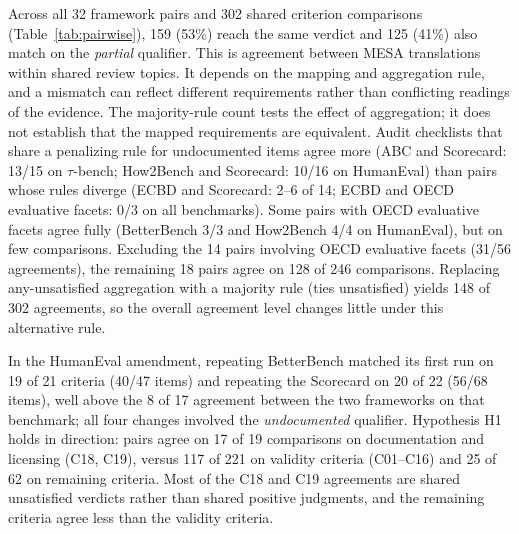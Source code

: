 \documentclass[10pt,conference]{IEEEtran}
\begin{document}
Across all 32 framework pairs and 302 shared criterion comparisons (Table~\ref{tab:pairwise}), 159 (53\%) reach the same verdict and 125 (41\%) also match on the \emph{partial} qualifier. This is agreement between MESA translations within shared review topics. It depends on the mapping and aggregation rule, and a mismatch can reflect different requirements rather than conflicting readings of the evidence. The majority-rule count tests the effect of aggregation; it does not establish that the mapped requirements are equivalent. Audit checklists that share a penalizing rule for undocumented items agree more (ABC and Scorecard: 13/15 on $\tau$-bench; How2Bench and Scorecard: 10/16 on HumanEval) than pairs whose rules diverge (ECBD and Scorecard: 2--6 of 14; ECBD and OECD evaluative facets: 0/3 on all benchmarks). Some pairs with OECD evaluative facets agree fully (BetterBench 3/3 and How2Bench 4/4 on HumanEval), but on few comparisons. Excluding the 14 pairs involving OECD evaluative facets (31/56 agreements), the remaining 18 pairs agree on 128 of 246 comparisons. Replacing any-unsatisfied aggregation with a majority rule (ties unsatisfied) yields 148 of 302 agreements, so the overall agreement level changes little under this alternative rule.

In the HumanEval amendment, repeating BetterBench matched its first run on 19 of 21 criteria (40/47 items) and repeating the Scorecard on 20 of 22 (56/68 items), well above the 8 of 17 agreement between the two frameworks on that benchmark; all four changes involved the \emph{undocumented} qualifier. Hypothesis H1 holds in direction: pairs agree on 17 of 19 comparisons on documentation and licensing (C18, C19), versus 117 of 221 on validity criteria (C01--C16) and 25 of 62 on remaining criteria. Most of the C18 and C19 agreements are shared unsatisfied verdicts rather than shared positive judgments, and the remaining criteria agree less than the validity criteria.
\end{document}
